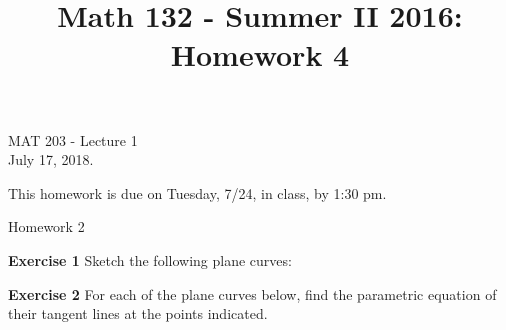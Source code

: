 \documentclass[12pt,oneside]{exam}
\title{Math 132 - Summer II 2016: Homework 4}
\newenvironment{exercise}[1]{\vspace{.1in}\noindent\textbf{Exercise #1 \hspace{.05em}}}{}
\begin{document}
\begin{flushright}
\sc MAT 203 - Lecture 1\\
July 17, 2018.
\end{flushright}
\bigskip

This homework is due on Tuesday, 7/24, in class, by 1:30 pm. 
\begin{center}
\textsf{Homework 2} 
\end{center}

\begin{exercise}{1}
Sketch the following plane curves:

\end{exercise}

\begin{exercise}{2} 
For each of the plane curves below, find the parametric equation of their tangent lines at the points indicated. 
\end{exercise}
\end{document}
